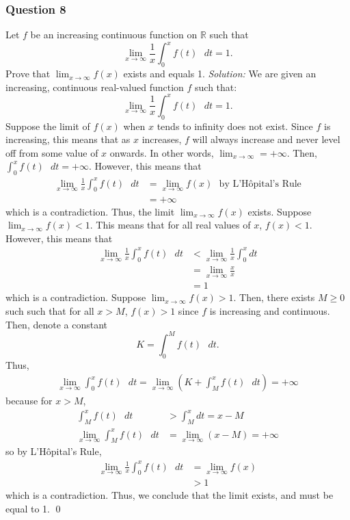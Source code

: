 \documentclass{article}
\begin{document}
\subsubsection*{Question 8}
Let $f$ be an increasing continuous function on $\mathbb{R}$ such that \[\lim_{x\rightarrow\infty}\frac{1}{x}\int_{0}^{x}f(t)\text{ }dt=1.\] Prove that $\lim_{x\rightarrow\infty}f(x)$ exists and equals 1.
\newline\newline\textit{Solution:} We are given an increasing, continuous real-valued function $f$ such that:\[\lim_{x\to\infty}\frac1x\int^x_0f(t)\text{ }dt=1.\]
Suppose the limit of $f(x)$ when $x$ tends to infinity does not exist. Since $f$ is increasing, this means that as $x$ increases, $f$ will always increase and never level off from some value of $x$ onwards. In other words, $\displaystyle \lim_{x\to\infty} = +\infty.$ Then, $\displaystyle\int^x_0f(t)\text{ }dt=+\infty $. However, this means that
\begin{align*}
    \lim_{x\to\infty}\frac{1}{x}\int_{0}^{x}f(t)\text{ }dt&=\lim_{x\to\infty}f(x) \ \ \ \text{by L'Hôpital's Rule}\\ &= +\infty
\end{align*}
which is a contradiction. Thus, the limit $\displaystyle\lim_{x\to\infty}f(x)$ exists.
\newline
\newline
Suppose $\displaystyle\lim_{x\to\infty}f(x)<1$. This means that for all real values of $x$, $f(x)<1$. However, this means that
\begin{align*}
   \lim_{x\rightarrow\infty}\frac{1}{x}\int_{0}^{x}f(t)\text{ }dt&<\lim_{x\to\infty}\frac{1}{x}\int_{0}^{x}dt\\
    &=\lim_{x\to\infty}\frac{x}{x}\\&=1
\end{align*}
which is a contradiction.
\newline
\newline Suppose $\displaystyle\lim_{x\to\infty}f(x)>1$. Then, there exists $M\ge 0$ such such that for all $x>M$, $f(x)>1$ since $f$ is increasing and continuous. Then, denote a constant \[K = \int^M_0f(t)\text{ }dt.\]
Thus, 
\begin{align*}
\lim_{x\to\infty}\int^x_0f(t)\text{ }dt =  \lim_{x\to\infty}\left(K+\int^x_M f(t) \text{ }dt \right)= +\infty
\end{align*}
because for $x>M$,
\begin{align*}
    \int^x_M f(t)\text{ } dt &>\int^x_M dt = x-M \\
    \lim_{x\to\infty}\int^x_M f(t) \text{ }dt &= \lim_{x\to\infty}(x-M) = +\infty
\end{align*}
so by L'Hôpital's Rule,
\begin{align*}
    \lim_{x\to\infty}\frac{1}{x}\int_0^xf(t)\text{ }dt&= \lim_{x\to\infty}f(x) \\ &>1
\end{align*}
which is a contradiction.
\newline
\newline Thus, we conclude that the limit exists, and must be equal to 1. \qed 
\end{document}
